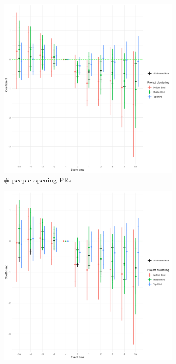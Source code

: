 \documentclass[12pt,notitlepage]{article}
\begin{document}
\begin{itemize}
\begin{figure}[htbp]
\begin{subfigure}[b]{0.32\textwidth}
    \includegraphics[width=\textwidth]{temp/project_clus_cc_combined_2p_back_bin_third.png}
    \caption{\# people opening PRs}
    \label{fig:clustering_cc}
  \end{subfigure}\hfill
  \begin{subfigure}[b]{0.32\textwidth}
    \centering
    \includegraphics[width=\textwidth]{temp/project_clus_avg_combined_2p_back_bin_third.png}

\end{subfigure}
\end{figure}
\end{itemize}
\end{document}
